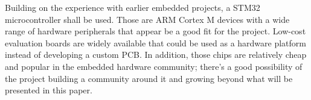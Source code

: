 Building on the experience with earlier embedded projects, a STM32 microcontroller shall be used. Those are ARM Cortex M devices with a wide range of hardware peripherals that appear be a good fit for the project. Low-cost evaluation boards are widely available that could be used as a hardware platform instead of developing a custom \gls{PCB}. In addition, those chips are relatively cheap and popular in the embedded hardware community; there's a good possibility of the project building a community around it and growing beyond what will be presented in this paper.

